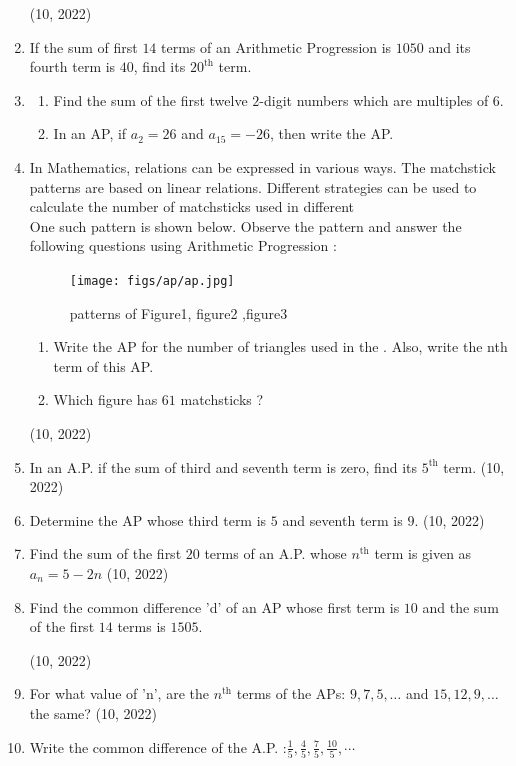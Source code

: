\begin{enumerate}[label=\thesubsection.\arabic*,ref=\thesubsection.\theenumi,itemsep=1pt]
        \hfill (10, 2022) \item If the sum of first $14$ terms of an Arithmetic Progression is $1050$ and its fourth term is $40$, find its $20^{\text{th}}$ term.

     \item 
    \begin{enumerate}
         \item Find the sum of the first twelve $2$-digit numbers which are 
multiples of $6$.

         \item In an AP, if $a_2=26$ and $a _ {15} = -26$, then write the AP.
        \end{enumerate}
         \item In Mathematics, relations can be expressed in various ways. The 
matchstick patterns are based on linear relations. Different strategies 
can be used to calculate the number of matchsticks used in different 
 \\One such pattern is shown below. Observe the pattern and answer the 
following questions using Arithmetic Progression :
\begin{figure}[H]
    \centering
	\texttt{[image: figs/ap/ap.jpg]}
	\caption{patterns of Figure1, figure2 ,figure3}
    \label{fig:ap}
\end{figure}
    \begin{enumerate}
	 \item Write the AP for the number of triangles used in the . Also, 
write the nth term of this AP.
 \item Which figure has $61$ matchsticks ? 
    \end{enumerate} 

    \hfill (10, 2022) 
 \item In an A.P. if the sum of third and seventh term is zero, find its $5^{\text{th}}$ term.
        \hfill (10, 2022)
  \item Determine the AP whose third term is $5$ and seventh term is $9$.
        \hfill (10, 2022) \item Find the sum of the first $20$ terms of an A.P. whose $n^{\text{th}}$ term is given as $a_n=5-2n$
        \hfill (10, 2022) \item Find the common difference 'd' of an AP whose first term is $10$ and the sum of the first $14$ terms is $1505$.

        \hfill (10, 2022) \item For what value of 'n', are the $n^{\text{th}}$ terms of the APs: $9,7,5,\dots$ and $15,12,9,\dots$ the same?
    \hfill (10, 2022)
	 \item Write the common difference of the A.P. :$\frac{1}{5}, \frac{4}{5}, \frac{7}{5}, \frac{10}{5}, \cdots$


\end{enumerate}
